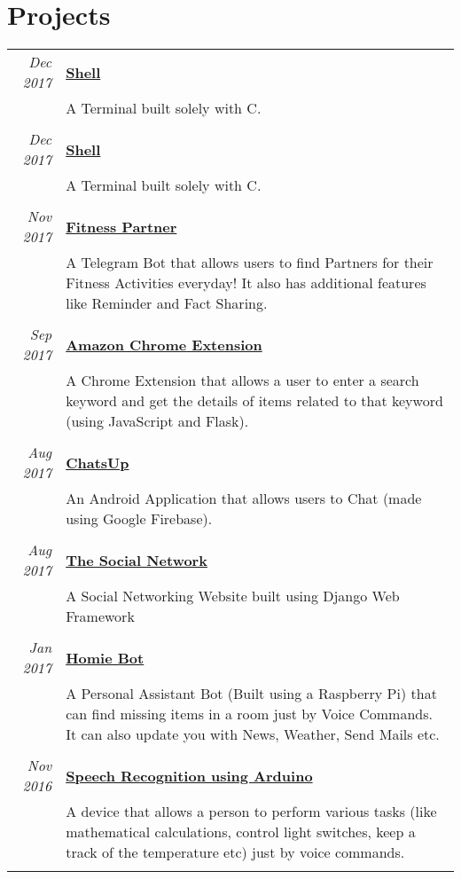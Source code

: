 \documentclass[a4paper,10pt]{article}
\begin{document}
\section{Projects}
\begin{tabular}{r|p{13.5cm}}
 \emph{Dec 2017} & \href{https://github.com/YashitM/Shell}{\textbf{Shell}} \\&\normalsize{A Terminal built solely with C.}\\\multicolumn{2}{c}{} \\
 \emph{Dec 2017} & \href{https://github.com/YashitM/Shell}{\textbf{Shell}} \\&\normalsize{A Terminal built solely with C.}\\\multicolumn{2}{c}{} \\
 \emph{Nov 2017} & \href{https://github.com/dvatsav/FitnessPartner}{\textbf{Fitness Partner}} \\&\normalsize{A Telegram Bot that allows users to find Partners for their Fitness Activities everyday! It also has additional features like Reminder and Fact Sharing.}\\\multicolumn{2}{c}{} \\
 \emph{Sep 2017} & \href{https://github.com/YashitM/Amazon-Chrome-Extension}{\textbf{Amazon Chrome Extension}} \\&\normalsize{A Chrome Extension that allows a user to enter a search keyword and get the details of items related to that keyword (using JavaScript and Flask).}\\\multicolumn{2}{c}{} \\
 \emph{Aug 2017} & \href{https://github.com/YashitM/ChatsUp}{\textbf{ChatsUp}} \\&\normalsize{An Android Application that allows users to Chat (made using Google Firebase).}\\\multicolumn{2}{c}{} \\ 
 \emph{Aug 2017} & \href{https://github.com/abhay-tyagi/Social_Network}{\textbf{The Social Network}} \\&\normalsize{A Social Networking Website built using Django Web Framework}\\\multicolumn{2}{c}{} \\
 \emph{Jan 2017} & \href{https://github.com/YashitM/Homie-Bot}{\textbf{Homie Bot}} \\&\normalsize{A Personal Assistant Bot (Built using a Raspberry Pi) that can find missing items in a room just by Voice Commands. It can also update you with News, Weather, Send Mails etc.}\\\multicolumn{2}{c}{} \\
 \emph{Nov 2016} & \href{https://github.com/YashitM/Arduino-Speech-Recog}{\textbf{Speech Recognition using Arduino}} \\&\normalsize{A device that allows a person to perform various tasks (like mathematical calculations, control light switches, keep a track of the temperature etc) just by voice commands.}\\\multicolumn{2}{c}{} \\

\end{tabular}
\end{document}
